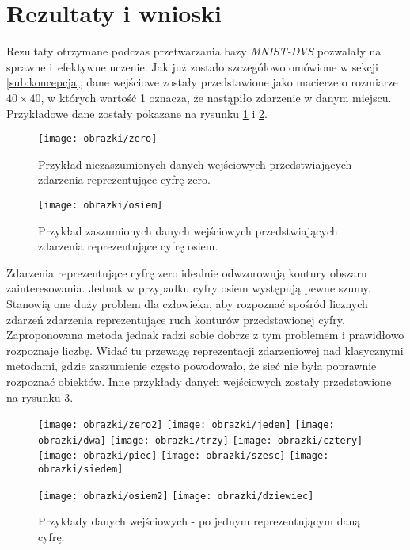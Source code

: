 \section{Rezultaty i wnioski}
\label{sub:rezultaty}

Rezultaty otrzymane podczas przetwarzania bazy \textit{MNIST-DVS} pozwalały na sprawne i~efektywne uczenie. Jak już zostało szczegółowo omówione w sekcji \ref{sub:koncepcja}, dane wejściowe zostały przedstawione jako macierze o rozmiarze $40 \times 40$, w których wartość 1 oznacza, że nastąpiło zdarzenie w danym miejscu. Przykładowe dane zostały pokazane na rysunku \ref{fig:zero} i \ref{fig:osiem}.

\begin{figure}[H]
	\centering
	\texttt{[image: obrazki/zero]}
	\caption{\label{fig:subcaption_example}Przykład niezaszumionych danych wejściowych przedstwiających zdarzenia reprezentujące cyfrę zero.}{\label{fig:zero}}
\end{figure}

\begin{figure}[H]
	\centering
	\texttt{[image: obrazki/osiem]}
	\caption{\label{fig:subcaption_example}Przykład zaszumionych danych wejściowych przedstwiających zdarzenia reprezentujące cyfrę osiem.}{\label{fig:osiem}}
\end{figure}

\noindent Zdarzenia reprezentujące cyfrę zero idealnie odwzorowują kontury obszaru zainteresowania. Jednak w przypadku cyfry osiem występują pewne szumy. Stanowią one duży problem dla człowieka, aby rozpoznać spośród licznych zdarzeń zdarzenia reprezentujące ruch konturów przedstawionej cyfry. Zaproponowana metoda jednak radzi sobie dobrze z tym problemem i prawidłowo rozpoznaje liczbę. Widać tu przewagę reprezentacji zdarzeniowej nad klasycznymi metodami, gdzie zaszumienie często powodowało, że sieć nie była poprawnie rozpoznać obiektów. Inne przykłady danych wejściowych zostały przedstawione na rysunku \ref{fig:cyfry}.

\begin{figure}[H]
	\centering
	\texttt{[image: obrazki/zero2]}
	\texttt{[image: obrazki/jeden]}
	\texttt{[image: obrazki/dwa]}
	\texttt{[image: obrazki/trzy]}
	\texttt{[image: obrazki/cztery]}
	\texttt{[image: obrazki/piec]}
	\texttt{[image: obrazki/szesc]}
	\texttt{[image: obrazki/siedem]}
\end{figure}
	\newpage
\begin{figure}[H]
	\centering
	
	\texttt{[image: obrazki/osiem2]}
	\texttt{[image: obrazki/dziewiec]}
	\caption{\label{fig:subcaption_example}Przykłady danych wejściowych - po jednym reprezentującym daną cyfrę.}{\label{fig:cyfry}}
\end{figure}

